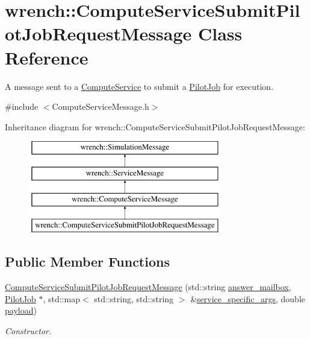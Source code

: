\hypertarget{classwrench_1_1_compute_service_submit_pilot_job_request_message}{}\section{wrench\+:\+:Compute\+Service\+Submit\+Pilot\+Job\+Request\+Message Class Reference}
\label{classwrench_1_1_compute_service_submit_pilot_job_request_message}


A message sent to a \hyperlink{classwrench_1_1_compute_service}{Compute\+Service} to submit a \hyperlink{classwrench_1_1_pilot_job}{Pilot\+Job} for execution.  




{\ttfamily \#include $<$Compute\+Service\+Message.\+h$>$}

Inheritance diagram for wrench\+:\+:Compute\+Service\+Submit\+Pilot\+Job\+Request\+Message\+:\begin{figure}[H]
\begin{center}
\leavevmode
\includegraphics[height=4.000000cm]{classwrench_1_1_compute_service_submit_pilot_job_request_message}
\end{center}
\end{figure}
\subsection*{Public Member Functions}
\begin{DoxyCompactItemize}
\item 
\hyperlink{classwrench_1_1_compute_service_submit_pilot_job_request_message_a5054acc3446406bc1bb5b69aa6427e58}{Compute\+Service\+Submit\+Pilot\+Job\+Request\+Message} (std\+::string \hyperlink{classwrench_1_1_compute_service_submit_pilot_job_request_message_a7f6ae704e92a873bcaaa87972b66e420}{answer\+\_\+mailbox}, \hyperlink{classwrench_1_1_pilot_job}{Pilot\+Job} $\ast$, std\+::map$<$ std\+::string, std\+::string $>$ \&\hyperlink{classwrench_1_1_compute_service_submit_pilot_job_request_message_af88e80196f64d6530548dbe17df006de}{service\+\_\+specific\+\_\+args}, double \hyperlink{classwrench_1_1_simulation_message_a914f2732713f7c02898e66f05a7cb8a1}{payload})
\begin{DoxyCompactList}\small\item\em Constructor. \end{DoxyCompactList}\end{DoxyCompactItemize}
